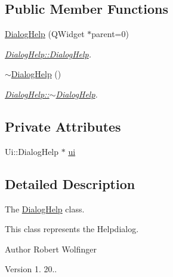 \subsection*{Public Member Functions}
\begin{DoxyCompactItemize}
\item 
\hyperlink{class_dialog_help_a8c9e470d3a7a8b2e28c4e59d020bf51e}{Dialog\+Help} (Q\+Widget $\ast$parent=0)
\begin{DoxyCompactList}\small\item\em \hyperlink{class_dialog_help_a8c9e470d3a7a8b2e28c4e59d020bf51e}{Dialog\+Help\+::\+Dialog\+Help}. \end{DoxyCompactList}\item 
\hyperlink{class_dialog_help_a4c076a8c67ad264caf067c9135911839}{$\sim$\+Dialog\+Help} ()
\begin{DoxyCompactList}\small\item\em \hyperlink{class_dialog_help_a4c076a8c67ad264caf067c9135911839}{Dialog\+Help\+::$\sim$\+Dialog\+Help}. \end{DoxyCompactList}\end{DoxyCompactItemize}
\subsection*{Private Attributes}
\begin{DoxyCompactItemize}
\item 
Ui\+::\+Dialog\+Help $\ast$ \hyperlink{class_dialog_help_a7e241423eb5ac274a3f1bde98ad625dd}{ui}
\end{DoxyCompactItemize}


\subsection{Detailed Description}
The \hyperlink{class_dialog_help}{Dialog\+Help} class. 

This class represents the Helpdialog.

\begin{DoxyAuthor}{Author}
Robert Wolfinger 
\end{DoxyAuthor}
\begin{DoxyVersion}{Version}
1. 20.. 
\end{DoxyVersion}


